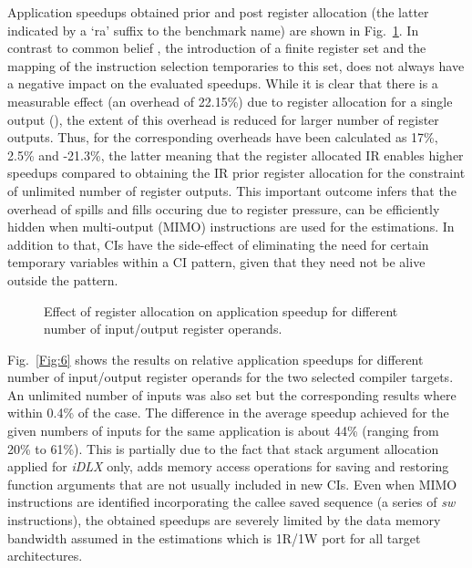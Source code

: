 \documentclass{comjnl}
\begin{document}
Application speedups obtained prior and post register allocation (the latter indicated by a `ra' suffix to the benchmark name) are shown in Fig.~\ref{Fig:5}. In contrast to common belief \cite{ClarkN03,Castro04}, the introduction of a finite register set and the mapping of the instruction selection temporaries to this set, does not always have a negative impact on the evaluated speedups. While it is clear that there is a measurable effect (an overhead of 22.15\%) due to register allocation for a single output (), the extent of this overhead is reduced for larger number of register outputs. Thus, for  the corresponding overheads have been calculated as 17\%, 2.5\% and -21.3\%, the latter meaning that the register allocated IR enables higher speedups compared to obtaining the IR prior register allocation for the constraint of unlimited number of register outputs. This important outcome infers that the overhead of spills and fills occuring due to register pressure, can be efficiently hidden when multi-output (MIMO) instructions are used for the estimations. In addition to that, CIs have the side-effect of eliminating the need for certain temporary variables within a CI pattern, given that they need not be alive outside the pattern. 

\begin{figure}[tb]
  \centering
  \caption{Effect of register allocation on application speedup for different number of input/output register operands.}
  \label{Fig:5}
  \vspace{-0.5cm}
\end{figure}

Fig.~\ref{Fig:6} shows the results on relative application speedups for different number of input/output register operands for the two selected compiler targets. An unlimited number of inputs was also set but the corresponding results where within 0.4\% of the  case.
The difference in the average speedup achieved for the given numbers of inputs for the same application is about 44\% (ranging from 20\% to 61\%). This is partially due to the fact that stack argument allocation applied for {\it iDLX} only, adds memory access operations for saving and restoring function arguments that are not usually included in new CIs. Even when MIMO instructions are identified incorporating the callee saved sequence (a series of {\it sw} instructions), the obtained speedups are severely limited by the data memory bandwidth assumed in the estimations which is 1R/1W port for all target architectures.
\end{document}
